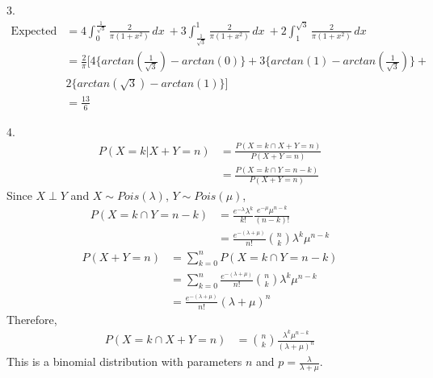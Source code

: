 \documentclass[11pt]{article}
\begin{document}
\begin{solution}
\item 3. 
\begin{align*}
	\text{Expected score} 
	& = 4\int_{0}^{\frac{1}{\sqrt{3}}} \frac{2}{\pi(1+x^2)} \,dx\ + 3\int_{\frac{1}{\sqrt{3}}}^{1} \frac{2}{\pi(1+x^2)} \,dx\  + 2\int_{1}^{\sqrt{3}} \frac{2}{\pi(1+x^2)} \,dx\ \\
	& = \frac{2}{\pi} [4\{arctan(\frac{1}{\sqrt{3}}) - arctan(0)\}+3\{arctan(1)-arctan(\frac{1}{\sqrt{3}})\}+ \\ 
	& 2\{arctan(\sqrt{3})-arctan(1)\}]\\
	& = \frac{13}{6}
\end{align*}
\item 4.
\begin{align*}
	P(X=k|X+Y=n)
	& = \frac{P(X=k \cap X+Y=n)}{P(X+Y=n)}\\
	& = \frac{P(X=k \cap Y=n-k)}{P(X+Y=n)}
\end{align*}
Since $X \perp Y$ and $X \sim Pois(\lambda)$, $Y \sim Pois(\mu)$,
\begin{align*}
P(X=k \cap Y=n-k)
	& = \frac{e^{-\lambda}\lambda^k}{k!} \frac{e^{-\mu}\mu^{n-k}}{(n-k)!} \\
	& = \frac{e^{-(\lambda+\mu)}}{n!} {n \choose k} \lambda^k \mu^{n-k}
\end{align*}
\begin{align*}
P(X+Y=n)
	& = \sum^{n}_{k=0}P(X=k \cap Y=n-k) \\
	& = \sum^{n}_{k=0}\frac{e^{-(\lambda+\mu)}}{n!} {n \choose k} \lambda^k \mu^{n-k}\\
	& = \frac{e^{-(\lambda+\mu)}}{n!}  (\lambda+\mu)^{n}
\end{align*}
Therefore,
\begin{align*}
P(X=k \cap X+Y=n)
	& =  {n \choose k} \frac{\lambda^k \mu^{n-k}}{(\lambda+\mu)^{n}}
\end{align*}
This is a binomial distribution with parameters $n$ and $p = \frac{\lambda}{\lambda + \mu}$.
\end{solution}
\end{document}

